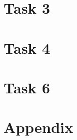 \documentclass[	runningheads,
				a4paper]{llncs}
\begin{document}
\section{Task 3}







\section{Task 4}





\section{Task 6}









\appendix
\section{Appendix}



	
\end{document}
